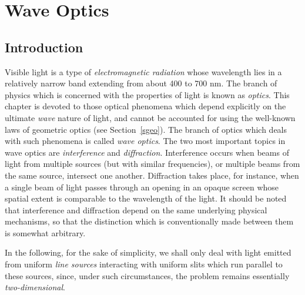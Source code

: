 \chapter{Wave Optics}\label{c11}
\section{Introduction}
Visible light is a type of {\em electromagnetic radiation}\/ whose wavelength
lies in a relatively narrow band extending from about 400 to 700 nm. 
The branch of physics which is concerned with  the properties of light is known as {\em optics}. 
This chapter is devoted to those optical phenomena which depend explicitly on the ultimate {\em wave}\/
nature of light, and cannot be accounted for using the well-known laws of geometric optics (see Section~\ref{sgeo}). 
The branch of optics which deals with such phenomena is called {\em wave optics}.  
The two most important topics in wave optics are {\em interference}\/ and {\em diffraction}. Interference occurs
when beams of light from multiple sources (but with similar frequencies), or  multiple beams from the same source,  intersect one another. Diffraction takes place, for instance,  when a single  beam of light passes through an opening in
an opaque screen whose spatial extent is  comparable to the wavelength of the light. It should be noted that interference and
diffraction depend on the same underlying physical mechanisms, so that the distinction which is conventionally made between them is somewhat arbitrary. 

In the following, for the sake of
simplicity, we shall only deal with light emitted from uniform {\em line sources}\/ interacting with uniform slits which run
parallel to these sources, since, under such circumstances, the problem remains essentially {\em  two-dimensional}. 

